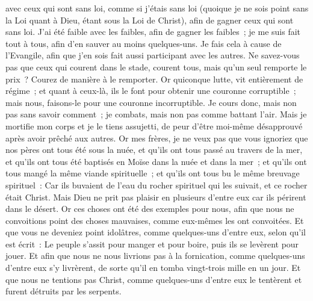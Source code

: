 \begin{multicols}{2}
avec ceux qui sont sans loi, comme si j'étais sans loi (quoique je ne sois point sans la Loi quant à Dieu, étant sous la Loi de Christ), afin de gagner ceux qui sont sans loi.
J'ai été faible avec les faibles, afin de gagner les faibles~; je me suis fait tout à tous, afin d'en sauver au moins quelques-uns.
Je fais cela à cause de l'Evangile, afin que j'en sois fait aussi participant avec les autres.
Ne savez-vous pas que ceux qui courent dans le stade, courent tous, mais qu'un seul remporte le prix~? Courez de manière à le remporter.
Or quiconque lutte, vit entièrement de régime~; et quant à ceux-là, ils le font pour obtenir une couronne corruptible~; mais nous, faisons-le pour une couronne incorruptible.
Je cours donc, mais non pas sans savoir comment~; je combats, mais non pas comme battant l'air.
Mais je mortifie mon corps et je le tiens assujetti, de peur d'être moi-même désapprouvé après avoir prêché aux autres.
\VerseOne{}Or mes frères, je ne veux pas que vous ignoriez que nos pères ont tous été sous la nuée, et qu'ils ont tous passé au travers de la mer,
et qu'ils ont tous été baptisés en Moïse dans la nuée et dans la mer~;
et qu'ils ont tous mangé la même viande spirituelle~;
et qu'ils ont tous bu le même breuvage spirituel~: Car ils buvaient de l'eau du rocher spirituel qui les suivait, et ce rocher était Christ.
Mais Dieu ne prit pas plaisir en plusieurs d'entre eux car ils périrent dans le désert.
Or ces choses ont été des exemples pour nous, afin que nous ne convoitions point des choses mauvaises, comme eux-mêmes les ont convoitées.
Et que vous ne deveniez point idolâtres, comme quelques-uns d'entre eux, selon qu'il est écrit~: Le peuple s'assit pour manger et pour boire, puis ils se levèrent pour jouer.
Et afin que nous ne nous livrions pas à la fornication, comme quelques-uns d'entre eux s'y livrèrent, de sorte qu'il en tomba vingt-trois mille en un jour.
Et que nous ne tentions pas Christ, comme quelques-uns d'entre eux le tentèrent et furent détruits par les serpents.

\end{multicols}
